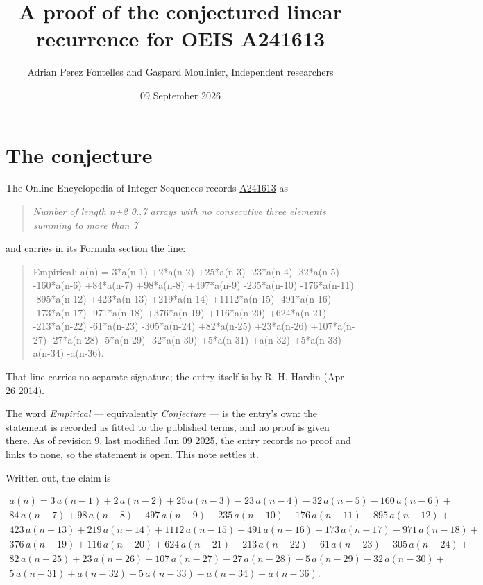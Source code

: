 \documentclass[11pt]{article}
\title{A proof of the conjectured linear recurrence for OEIS A241613}
\author{Adrian Perez Fontelles and Gaspard Moulinier, Independent researchers}
\date{09 September 2026}
\theoremstyle{definition}
\begin{document}
\maketitle
\section{The conjecture}

The Online Encyclopedia of Integer Sequences records \href{https://oeis.org/A241613}{A241613} as

\begin{quote}\itshape Number of length n+2 0..7 arrays with no consecutive three elements summing to more than 7\end{quote}

and carries in its Formula section the line:

\begin{quote}\ttfamily Empirical: a(n) = 3*a(n-1) +2*a(n-2) +25*a(n-3) -23*a(n-4) -32*a(n-5) -160*a(n-6) +84*a(n-7) +98*a(n-8) +497*a(n-9) -235*a(n-10) -176*a(n-11) -895*a(n-12) +423*a(n-13) +219*a(n-14) +1112*a(n-15) -491*a(n-16) -173*a(n-17) -971*a(n-18) +376*a(n-19) +116*a(n-20) +624*a(n-21) -213*a(n-22) -61*a(n-23) -305*a(n-24) +82*a(n-25) +23*a(n-26) +107*a(n-27) -27*a(n-28) -5*a(n-29) -32*a(n-30) +5*a(n-31) +a(n-32) +5*a(n-33) -a(n-34) -a(n-36).\end{quote}

That line carries no separate signature; the entry itself is by R. H. Hardin (Apr 26 2014).

The word {\itshape Empirical} --- equivalently {\itshape Conjecture} --- is the entry's own: the statement is recorded as fitted to the published terms, and no proof is given there. As of revision 9, last modified Jun 09 2025, the entry records no proof and links to none, so the statement is open. This note settles it.

Written out, the claim is

\begin{multline*} a(n) = 3\,a(n-1) + 2\,a(n-2) + 25\,a(n-3) - 23\,a(n-4) - 32\,a(n-5) - 160\,a(n-6) + \\ 84\,a(n-7) + 98\,a(n-8) + 497\,a(n-9) - 235\,a(n-10) - 176\,a(n-11) - 895\,a(n-12) + \\ 423\,a(n-13) + 219\,a(n-14) + 1112\,a(n-15) - 491\,a(n-16) - 173\,a(n-17) - 971\,a(n-18) + \\ 376\,a(n-19) + 116\,a(n-20) + 624\,a(n-21) - 213\,a(n-22) - 61\,a(n-23) - 305\,a(n-24) + \\ 82\,a(n-25) + 23\,a(n-26) + 107\,a(n-27) - 27\,a(n-28) - 5\,a(n-29) - 32\,a(n-30) + \\ 5\,a(n-31) + a(n-32) + 5\,a(n-33) - a(n-34) - a(n-36). \end{multline*}
\end{document}
